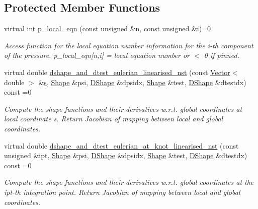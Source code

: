 \subsection*{Protected Member Functions}
\begin{DoxyCompactItemize}
\item 
virtual int \hyperlink{classoomph_1_1LinearisedNavierStokesEquations_a41fac6d78bdecf58d625ecbc95593a03}{p\+\_\+local\+\_\+eqn} (const unsigned \&n, const unsigned \&\hyperlink{cfortran_8h_adb50e893b86b3e55e751a42eab3cba82}{i})=0
\begin{DoxyCompactList}\small\item\em Access function for the local equation number information for the i-\/th component of the pressure. p\+\_\+local\+\_\+eqn\mbox{[}n,i\mbox{]} = local equation number or $<$ 0 if pinned. \end{DoxyCompactList}\item 
virtual double \hyperlink{classoomph_1_1LinearisedNavierStokesEquations_afb0b66566d03c7f9d8129614297e63ed}{dshape\+\_\+and\+\_\+dtest\+\_\+eulerian\+\_\+linearised\+\_\+nst} (const \hyperlink{classoomph_1_1Vector}{Vector}$<$ double $>$ \&\hyperlink{cfortran_8h_ab7123126e4885ef647dd9c6e3807a21c}{s}, \hyperlink{classoomph_1_1Shape}{Shape} \&psi, \hyperlink{classoomph_1_1DShape}{D\+Shape} \&dpsidx, \hyperlink{classoomph_1_1Shape}{Shape} \&test, \hyperlink{classoomph_1_1DShape}{D\+Shape} \&dtestdx) const =0
\begin{DoxyCompactList}\small\item\em Compute the shape functions and their derivatives w.\+r.\+t. global coordinates at local coordinate s. Return Jacobian of mapping between local and global coordinates. \end{DoxyCompactList}\item 
virtual double \hyperlink{classoomph_1_1LinearisedNavierStokesEquations_a87a2102128bc071afa16f2e950724ee3}{dshape\+\_\+and\+\_\+dtest\+\_\+eulerian\+\_\+at\+\_\+knot\+\_\+linearised\+\_\+nst} (const unsigned \&ipt, \hyperlink{classoomph_1_1Shape}{Shape} \&psi, \hyperlink{classoomph_1_1DShape}{D\+Shape} \&dpsidx, \hyperlink{classoomph_1_1Shape}{Shape} \&test, \hyperlink{classoomph_1_1DShape}{D\+Shape} \&dtestdx) const =0
\begin{DoxyCompactList}\small\item\em Compute the shape functions and their derivatives w.\+r.\+t. global coordinates at the ipt-\/th integration point. Return Jacobian of mapping between local and global coordinates. \end{DoxyCompactList}\item 

\end{DoxyCompactItemize}
